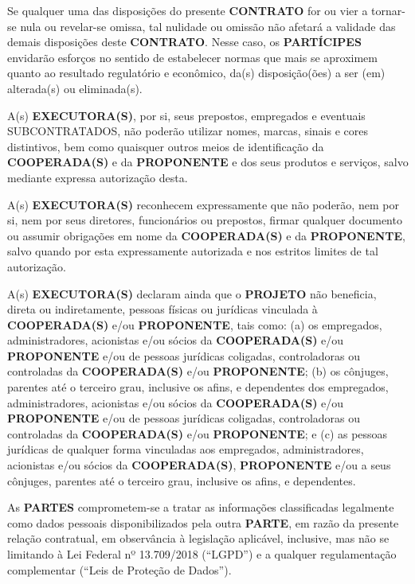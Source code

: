 \xx Se qualquer uma das disposições do presente \textbf{CONTRATO} for ou vier a tornar-se nula ou revelar-se omissa, tal nulidade ou omissão não afetará a validade das demais disposições deste \textbf{CONTRATO}. Nesse caso, os \textbf{PARTÍCIPES} envidarão esforços no sentido de estabelecer normas que mais se aproximem quanto ao resultado regulatório e econômico, da(s) disposição(ões) a ser (em) alterada(s) ou eliminada(s).

\xx A(s) \textbf{EXECUTORA(S)}, por si, seus prepostos, empregados e eventuais SUBCONTRATADOS, não poderão utilizar nomes, marcas, sinais e cores distintivos, bem como quaisquer outros meios de identificação da \textbf{COOPERADA(S)} e da \textbf{PROPONENTE} e dos seus produtos e serviços, salvo mediante expressa autorização desta.

\xx A(s) \textbf{EXECUTORA(S)} reconhecem expressamente que não poderão, nem por si, nem por seus diretores, funcionários ou prepostos, firmar qualquer documento ou assumir obrigações em nome da \textbf{COOPERADA(S)} e da \textbf{PROPONENTE}, salvo quando por esta expressamente autorizada e nos estritos limites de tal autorização.

\xx A(s) \textbf{EXECUTORA(S)} declaram ainda que o \textbf{PROJETO} não beneficia, direta ou indiretamente, pessoas físicas ou jurídicas vinculada à \textbf{COOPERADA(S)} e/ou \textbf{PROPONENTE}, tais como: (a) os empregados, administradores, acionistas e/ou sócios da \textbf{COOPERADA(S)} e/ou \textbf{PROPONENTE} e/ou de pessoas jurídicas coligadas, controladoras ou controladas da \textbf{COOPERADA(S)} e/ou \textbf{PROPONENTE}; (b) os cônjuges, parentes até o terceiro grau, inclusive os afins, e dependentes dos empregados, administradores, acionistas e/ou sócios da \textbf{COOPERADA(S)} e/ou \textbf{PROPONENTE} e/ou de pessoas jurídicas coligadas, controladoras ou controladas da \textbf{COOPERADA(S)} e/ou \textbf{PROPONENTE}; e (c) as pessoas jurídicas de qualquer forma vinculadas aos empregados, administradores, acionistas e/ou sócios da \textbf{COOPERADA(S)}, \textbf{PROPONENTE} e/ou a seus cônjuges, parentes até o terceiro grau, inclusive os afins, e dependentes.

\xx As \textbf{PARTES} comprometem-se a tratar as informações classificadas legalmente como dados pessoais disponibilizados pela outra \textbf{PARTE}, em razão da presente relação contratual, em observância à legislação aplicável, inclusive, mas não se limitando à Lei Federal nº 13.709/2018 (“LGPD”) e a qualquer regulamentação complementar (“Leis de Proteção de Dados”).

